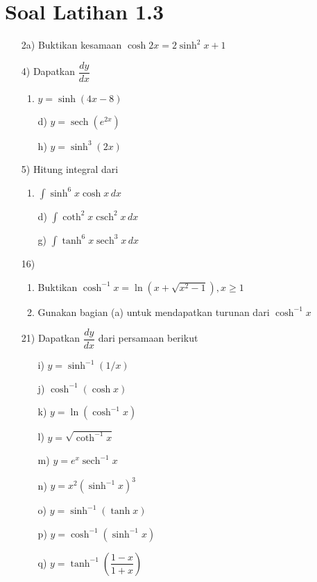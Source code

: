 \documentclass{article}
\DeclareMathOperator{\sech}{sech}
\DeclareMathOperator{\csch}{csch}
\begin{document}
\section*{Soal Latihan 1.3}
\begin{enumerate}
	\item[2a)] Buktikan kesamaan $\cosh 2x = 2\sinh^2 x +1$
	\item[4)] Dapatkan $\dfrac{dy}{dx}$
	\begin{enumerate}
		\item $y=\sinh (4x-8)$
		\item[d)] $y=\sech (e^{2x})$
		\item[h)] $y=\sinh^3 (2x)$
	\end{enumerate}
	\item[5)] Hitung integral dari
	\begin{enumerate}
		\item $\displaystyle \int \sinh^6 x\cosh x\, dx$
		\item[d)] $\displaystyle \int \coth^2 x\csch^2 x\, dx$
		\item[g)] $\displaystyle \int \tanh^6 x\sech^3 x\, dx$
	\end{enumerate}
	\item[16)] \begin{enumerate}
	\item Buktikan $\cosh^{-1} x=\ln(x+\sqrt{x^2-1}),x\geq 1$
	\item Gunakan bagian (a) untuk mendapatkan turunan dari $\cosh^{-1}x$
	\end{enumerate}
	\item[21)] Dapatkan $\dfrac{dy}{dx}$ dari persamaan berikut
	\begin{enumerate}
		\item[i)] $y=\sinh^{-1}(1/x)$
		\item[j)] $\cosh^{-1}(\cosh x)$
		\item[k)] $y=\ln(\cosh^{-1}x)$
		\item[l)] $y=\sqrt{\coth^{-1}x}$
		\item[m)] $y=e^x\sech^{-1}x$
		\item[n)] $y=x^2(\sinh^{-1}x)^3$
		\item[o)] $y=\sinh^{-1}(\tanh x)$
		\item[p)] $y=\cosh^{-1}(\sinh^{-1}x)$
		\item[q)] $y=\tanh^{-1}\left(\dfrac{1-x}{1+x}\right)$
	\end{enumerate}
\end{enumerate}
\newpage
\end{document}

